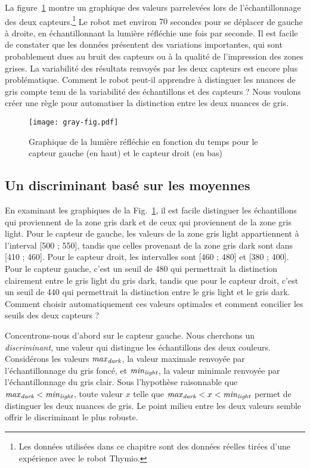 La figure~\ref{fig.closegrays2} montre un graphique des valeurs parrelevées lors de l'échantillonnage des deux capteurs.\footnote{Les données utilisées dans ce chapitre sont des données réelles tirées d'une expérience avec le robot Thymio.} Le robot met environ $70$ secondes pour se déplacer de gauche à droite, en échantillonnant la lumière réfléchie une fois par seconde. Il est facile de constater que les données présentent des variations importantes, qui sont probablement dues au bruit des capteurs ou à la qualité de l’impression des zones grises. La variabilité des résultats renvoyés par les deux capteurs est encore plus problématique. Comment le robot peut-il apprendre à distinguer les nuances de gris compte tenu de la variabilité des échantillons et des capteurs ? Nous voulons créer une règle pour automatiser la distinction entre les deux nuances de gris. 

\begin{figure}
\begin{center}
\texttt{[image: gray-fig.pdf]}
\end{center}
\caption{Graphique de la lumière réfléchie en fonction du temps pour le capteur gauche (en haut) et le capteur droit (en bas)}\label{fig.closegrays2}
\end{figure}

\subsection{Un discriminant basé sur les moyennes}

En examinant les graphiques de la Fig.~\ref{fig.closegrays2}, il est facile distinguer les échantillons qui proviennent de la zone gris dark et de ceux qui proviennent de la zone gris light. Pour le capteur de gauche, les valeurs de la zone gris light appartiennent à l'interval [500 ; 550], tandis que celles provenant de la zone gris dark sont dans [410 ; 460]. Pour le capteur droit, les intervalles sont [460 ; 480] et [380 ; 400]. Pour le capteur gauche, c'est un seuil de 480 qui permettrait la distinction clairement entre le gris light du gris dark, tandis que pour le capteur droit, c'est un seuil de 440 qui permettrait la distinction entre le gris light et le gris dark. Comment choisir automatiquement ces valeurs optimales et comment concilier les seuils des deux capteurs ?

Concentrons-nous d'abord sur le capteur gauche. Nous cherchons un \textit{discriminant}, une valeur qui distingue les échantillons des deux couleurs. Considérons les valeurs $\mathit{max}_{\textit{\scriptsize dark}}$, la valeur maximale renvoyée par l'échantillonnage du gris foncé, et $\mathit{min}_{\textit{\scriptsize light}}$, la valeur minimale renvoyée par l'échantillonnage du gris clair. Sous l'hypothèse raisonnable que
$\mathit{max}_{\textit{\scriptsize dark}} < \mathit{min}_{\textit{\scriptsize light}}$, toute valeur $x$ telle que $\mathit{max}_{\textit{\scriptsize dark}} < x < \mathit{min}_{\textit{\scriptsize light}}$ permet de distinguer les deux nuances de gris. Le point milieu entre les deux valeurs semble offrir le discriminant le plus robuste.

